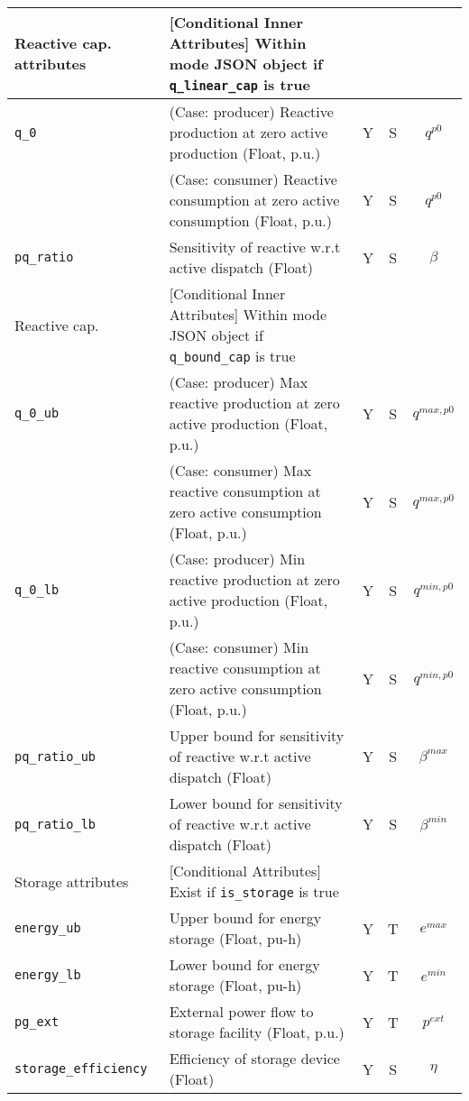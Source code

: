 \documentclass{article}
\begin{document}
\begin{center}
\small
\begin{tabular}{ l | l | c | c | c |}
 \hline
  Reactive cap. attributes & [Conditional Inner Attributes] Within mode JSON object if {\tt q\_linear\_cap} is true &  &  & \\
  \hline
  {\tt q\_0}               & {\color{red} (Case: producer) Reactive production at zero active production (Float, p.u.) }& Y & S & $q^{p0}$\\
                           & {\color{red} (Case: consumer) Reactive consumption at zero active consumption (Float, p.u.) }& Y & S & $q^{p0}$\\
  {\tt pq\_ratio}          & Sensitivity of reactive w.r.t active dispatch (Float) & Y & S & $\beta$\\
  \hline \hline
  Reactive cap. & [Conditional Inner Attributes] Within mode JSON object if {\tt q\_bound\_cap} is true &  &  & \\
  \hline
  {\tt q\_0\_ub}           & {\color{red} (Case: producer) Max reactive production at zero active production (Float, p.u.)} & Y & S & $q^{max,p0}$\\
                           & {\color{red} (Case: consumer) Max reactive consumption at zero active consumption (Float, p.u.)} & Y & S & $q^{max,p0}$\\
  {\tt q\_0\_lb}           & {\color{red} (Case: producer) Min reactive production at zero active production (Float, p.u.)} & Y & S & $q^{min,p0}$\\
                           & {\color{red} (Case: consumer) Min reactive consumption at zero active consumption (Float, p.u.)} & Y & S & $q^{min,p0}$\\
  {\tt pq\_ratio\_ub}      & Upper bound for sensitivity of reactive w.r.t active dispatch (Float) & Y & S & $\beta^{max}$\\
  {\tt pq\_ratio\_lb}      & Lower bound for sensitivity of reactive w.r.t active dispatch (Float) & Y & S & $\beta^{min}$\\
  \hline 
  \hline
  Storage attributes & [Conditional Attributes] Exist if {\tt is\_storage} is true &  &  & \\
  \hline
  {\tt energy\_ub} & Upper bound for energy storage (Float, pu-h)& Y & T & $e^{max}$\\
  {\tt energy\_lb} & Lower bound for energy storage (Float, pu-h)& Y & T & $e^{min}$\\ 
  {\tt pg\_ext} & External power flow to storage facility (Float, p.u.)& Y & T & $p^{ext}$\\ 
  {\tt storage\_efficiency} & Efficiency of storage device (Float) & Y & S & $\eta$\\
  \hline
\end{tabular}
\end{center}
\end{document}
